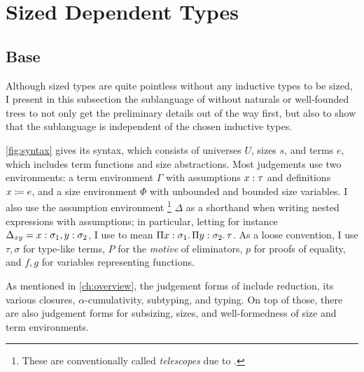 \chapter{Sized Dependent Types} \label{ch:sized-dep-types}





\section{Base \lang}

Although sized types are quite pointless without any inductive types to be sized,
I present in this subsection the sublanguage of \lang without naturals or well-founded trees
to not only get the preliminary details out of the way first,
but also to show that the sublanguage is independent of the chosen inductive types.

\cref{fig:syntax} gives its syntax, which consists of universes $U$,
sizes $s$, and terms $e$, which includes term functions and size abstractions.
Most judgements use two environments: a term environment $\Gamma$ with assumptions $x \mathrel{:} \tau$
and definitions $x \mathrel{\coloneqq} e$, and a size environment $\Phi$ with unbounded and bounded size variables.
I also use the assumption environment%
\footnote{These are conventionally called \emph{telescopes} due to \citet{telescope}.}
$\Delta$ as a shorthand when writing nested expressions with assumptions;
in particular, letting for instance $\Delta_{xy} = x \mathrel{:} \sigma_1, y \mathrel{:} \sigma_2$,
I use  to mean $\Pi x \mathrel{:} \sigma_1 \mathpunct{.} \Pi y \mathrel{:} \sigma_2 \mathpunct{.} \tau$.
As a loose convention, I use $\tau, \sigma$ for type-like terms,
$P$ for the \emph{motive} of eliminators,
$p$ for proofs of equality, and
$f, g$ for variables representing functions.

\clearpage %
As mentioned in \cref{ch:overview}, the judgement forms of \lang include
reduction, its various closures, $\alpha$-cumulativity, subtyping, and typing.
On top of those, there are also judgement forms for subsizing, sizes,
and well-formedness of size and term environments.

